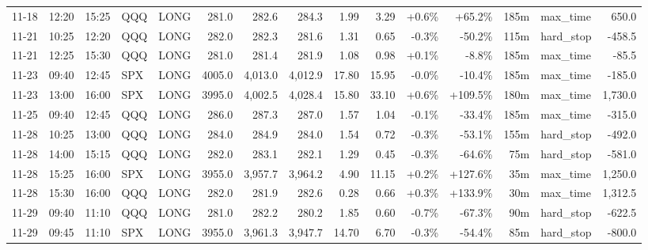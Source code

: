 \documentclass[11pt,a4paper,twoside]{article}
\begin{document}
\begin{landscape}
\begin{center}
\begin{longtable}{>{\color{txtmain}}l l l l l r r r r r r r r >{\color{txtmain}}l r}
11-18 & 12:20 & 15:25 & QQQ & LONG & 281.0 & 282.6 & 284.3 & 1.99 & 3.29 & \textcolor{wingreen}{+0.6\%} & \textcolor{wingreen}{+65.2\%} & 185m & max\_time & \textcolor{wingreen}{650.0} \\
11-21 & 10:25 & 12:20 & QQQ & LONG & 282.0 & 282.3 & 281.6 & 1.31 & 0.65 & \textcolor{lossred}{-0.3\%} & \textcolor{lossred}{-50.2\%} & 115m & hard\_stop & \textcolor{lossred}{-458.5} \\
11-21 & 12:25 & 15:30 & QQQ & LONG & 281.0 & 281.4 & 281.9 & 1.08 & 0.98 & \textcolor{wingreen}{+0.1\%} & \textcolor{lossred}{-8.8\%} & 185m & max\_time & \textcolor{lossred}{-85.5} \\
11-23 & 09:40 & 12:45 & SPX & LONG & 4005.0 & 4,013.0 & 4,012.9 & 17.80 & 15.95 & \textcolor{lossred}{-0.0\%} & \textcolor{lossred}{-10.4\%} & 185m & max\_time & \textcolor{lossred}{-185.0} \\
11-23 & 13:00 & 16:00 & SPX & LONG & 3995.0 & 4,002.5 & 4,028.4 & 15.80 & 33.10 & \textcolor{wingreen}{+0.6\%} & \textcolor{wingreen}{+109.5\%} & 180m & max\_time & \textcolor{wingreen}{1,730.0} \\
11-25 & 09:40 & 12:45 & QQQ & LONG & 286.0 & 287.3 & 287.0 & 1.57 & 1.04 & \textcolor{lossred}{-0.1\%} & \textcolor{lossred}{-33.4\%} & 185m & max\_time & \textcolor{lossred}{-315.0} \\
11-28 & 10:25 & 13:00 & QQQ & LONG & 284.0 & 284.9 & 284.0 & 1.54 & 0.72 & \textcolor{lossred}{-0.3\%} & \textcolor{lossred}{-53.1\%} & 155m & hard\_stop & \textcolor{lossred}{-492.0} \\
11-28 & 14:00 & 15:15 & QQQ & LONG & 282.0 & 283.1 & 282.1 & 1.29 & 0.45 & \textcolor{lossred}{-0.3\%} & \textcolor{lossred}{-64.6\%} & 75m & hard\_stop & \textcolor{lossred}{-581.0} \\
11-28 & 15:25 & 16:00 & SPX & LONG & 3955.0 & 3,957.7 & 3,964.2 & 4.90 & 11.15 & \textcolor{wingreen}{+0.2\%} & \textcolor{wingreen}{+127.6\%} & 35m & max\_time & \textcolor{wingreen}{1,250.0} \\
11-28 & 15:30 & 16:00 & QQQ & LONG & 282.0 & 281.9 & 282.6 & 0.28 & 0.66 & \textcolor{wingreen}{+0.3\%} & \textcolor{wingreen}{+133.9\%} & 30m & max\_time & \textcolor{wingreen}{1,312.5} \\
11-29 & 09:40 & 11:10 & QQQ & LONG & 281.0 & 282.2 & 280.2 & 1.85 & 0.60 & \textcolor{lossred}{-0.7\%} & \textcolor{lossred}{-67.3\%} & 90m & hard\_stop & \textcolor{lossred}{-622.5} \\
11-29 & 09:45 & 11:10 & SPX & LONG & 3955.0 & 3,961.3 & 3,947.7 & 14.70 & 6.70 & \textcolor{lossred}{-0.3\%} & \textcolor{lossred}{-54.4\%} & 85m & hard\_stop & \textcolor{lossred}{-800.0} \\

\end{longtable}
\end{center}
\end{landscape}
\end{document}
